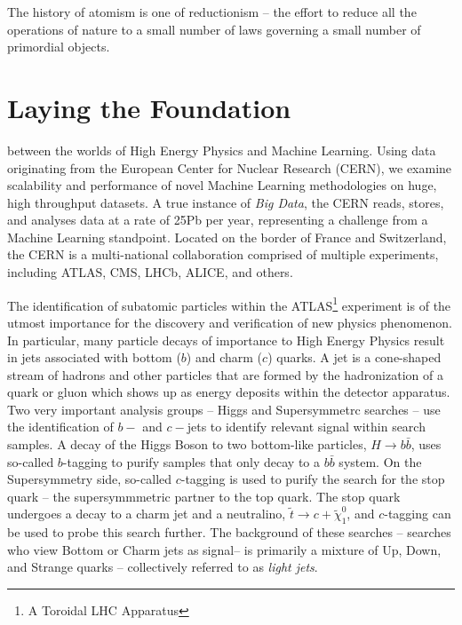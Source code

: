 \begin{savequote}[75mm] 
The history of atomism is one of reductionism – the effort to reduce all the operations of nature to a small number of laws governing a small number of primordial objects.
\end{savequote}

\chapter{Laying the Foundation}


 between the worlds of High Energy Physics and Machine Learning. Using data originating from the European Center for Nuclear Research (CERN), we examine scalability and performance of novel Machine Learning methodologies on huge, high throughput datasets. A true instance of \textit{Big Data}, the CERN reads, stores, and analyses data at a rate of 25Pb per year, representing a challenge from a Machine Learning standpoint. Located on the border of France and Switzerland, the CERN is a multi-national collaboration comprised of multiple experiments, including ATLAS, CMS, LHCb, ALICE, and others.

The identification of subatomic particles within the ATLAS\footnote{A Toroidal LHC Apparatus} experiment is of the utmost importance for the discovery and verification of new physics phenomenon. In particular, many particle decays of importance to High Energy Physics result in jets associated with bottom ($b$) and charm ($c$) quarks. A jet is a cone-shaped stream of hadrons and other particles that are formed by the hadronization of a quark or gluon which shows up as energy deposits within the detector apparatus. Two very important analysis groups -- Higgs and Supersymmetrc searches -- use the identification of $b-$ and $c-$jets to identify relevant signal within search samples. A decay of the Higgs Boson to two bottom-like particles, $H \longrightarrow b\bar{b}$, uses so-called $b$-tagging to purify samples that only decay to a $b\bar{b}$ system. On the Supersymmetry side, so-called $c$-tagging is used to purify the search for the stop quark -- the supersymmmetric partner to the top quark. The stop quark undergoes a decay to a charm jet and a neutralino, $\tilde{t}\longrightarrow c + \tilde{\chi}_{1}^{0}$, and $c$-tagging can be used to probe this search further. The background of these searches -- searches who view Bottom or Charm jets as signal-- is primarily a mixture of Up, Down, and Strange quarks -- collectively referred to as \textit{light jets}.

